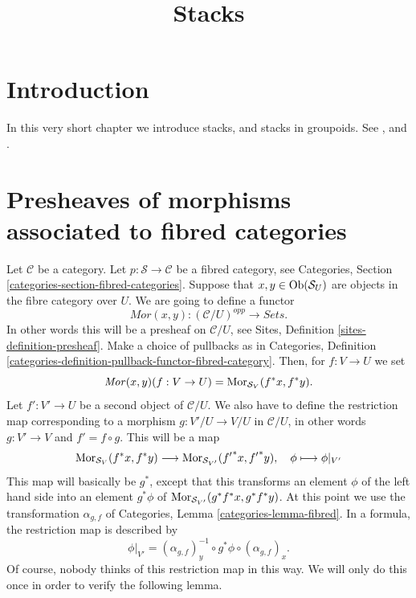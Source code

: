 

%


\title{Stacks}


\maketitle

\label{section-phantom}

\tableofcontents

\section{Introduction}
\label{section-introduction}

\noindent
In this very short chapter we introduce stacks, and
stacks in groupoids. See \cite{DM}, and \cite{Vis2}.


\section{Presheaves of morphisms associated to fibred categories}
\label{section-morphisms}

\noindent
Let $\mathcal{C}$ be a category.
Let $p : \mathcal{S} \to \mathcal{C}$ be a fibred category,
see Categories, Section \ref{categories-section-fibred-categories}.
Suppose that $x, y\in \mathop{\mathrm{Ob}}\nolimits(\mathcal{S}_U)$ are
objects in the fibre category over $U$. We are going to define
a functor
$$
\mathit{Mor}(x, y) : (\mathcal{C}/U)^{opp} \longrightarrow \textit{Sets}.
$$
In other words this will be a presheaf on $\mathcal{C}/U$, see
Sites, Definition \ref{sites-definition-presheaf}.
Make a choice of pullbacks as in
Categories,
Definition \ref{categories-definition-pullback-functor-fibred-category}.
Then, for $f : V \to U$ we set
$$
\mathit{Mor}(x, y)(f : V \to U) =
\mathop{\mathrm{Mor}}\nolimits_{\mathcal{S}_V}(f^\ast x, f^\ast y).
$$
Let $f' : V' \to U$ be a second object of $\mathcal{C}/U$.
We also have to define the restriction map corresponding to a
morphism $g : V'/U  \to V/U$ in $\mathcal{C}/U$,
in other words $g : V' \to V$ and $f' = f \circ g$.
This will be a map
$$
\mathop{\mathrm{Mor}}\nolimits_{\mathcal{S}_V}(f^\ast x, f^\ast y)
\longrightarrow
\mathop{\mathrm{Mor}}\nolimits_{\mathcal{S}_{V'}}({f'}^\ast x, {f'}^\ast y), \quad
\phi \longmapsto \phi|_{V'}
$$
This map will basically be $g^\ast$, except that this transforms
an element $\phi$ of the left hand side into an element
$g^\ast \phi$
of $\mathop{\mathrm{Mor}}\nolimits_{\mathcal{S}_{V'}}(g^\ast f^\ast x, g^\ast f^\ast y)$.
At this point we use the transformation $\alpha_{g, f}$ of
Categories, Lemma \ref{categories-lemma-fibred}.
In a formula, the restriction map is described by
$$
\phi|_{V'} =
(\alpha_{g, f})_y^{-1} \circ
g^\ast \phi \circ
(\alpha_{g, f})_x.
$$
Of course, nobody thinks of this restriction map in this way.
We will only do this once in order to verify the following
lemma.

